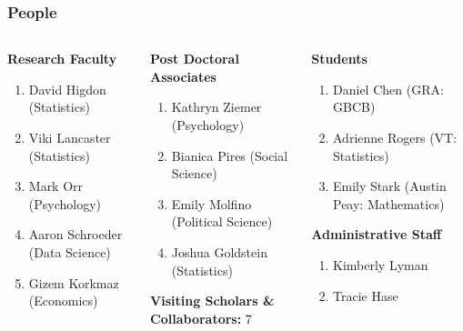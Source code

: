 \documentclass[compress]{beamer}
\begin{document}
    \begin{frame}[Blank] \frametitle{People}
        \small
        \begin{columns}
            \begin{column}{0.3\textwidth}
                \textbf{Research Faculty}
                \begin{enumerate}
                    \item David Higdon (Statistics)
                    \item Viki Lancaster (Statistics)
                    \item Mark Orr (Psychology)
                    \item Aaron Schroeder (Data Science)
                    \item Gizem Korkmaz (Economics)
                \end{enumerate}
            \end{column}

            \begin{column}{0.3\textwidth}
                \textbf{Post Doctoral Associates}
                \begin{enumerate}
                    \item Kathryn Ziemer (Psychology)
                    \item Bianica Pires (Social Science)
                    \item Emily Molfino (Political Science)
                    \item Joshua Goldstein (Statistics)
                \end{enumerate}

                \textbf{Visiting Scholars \& Collaborators:} 7
            \end{column}

            \begin{column}{0.3\textwidth}
                \textbf{Students}
                \begin{enumerate}
                    \item Daniel Chen (GRA: GBCB)
                    \item Adrienne Rogers (VT: Statistics)
                    \item Emily Stark (Austin Peay: Mathematics)
                \end{enumerate}

                \textbf{Administrative Staff}
                \begin{enumerate}
                    \item Kimberly Lyman
                    \item Tracie Hase
                \end{enumerate}
            \end{column}
        \end{columns}
    \end{frame}
\end{document}
